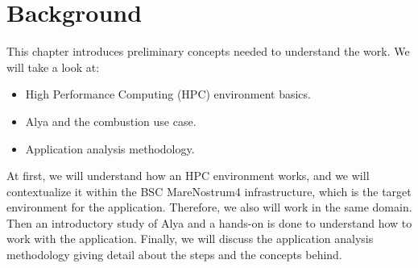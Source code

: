 \chapter{Background}

This chapter introduces preliminary concepts needed to understand the work. We will take a look at:

\begin{itemize}
  \item High Performance Computing (HPC) environment basics.
  \item Alya and the combustion use case.
  \item Application analysis methodology.
\end{itemize}

At first, we will understand how an HPC environment works, and we will contextualize it within the BSC MareNostrum4 infrastructure, which is the target environment for the application. Therefore, we also will work in the same domain. Then an introductory study of Alya and a hands-on is done to understand how to work with the application. Finally, we will discuss the application analysis methodology giving detail about the steps and the concepts behind.






